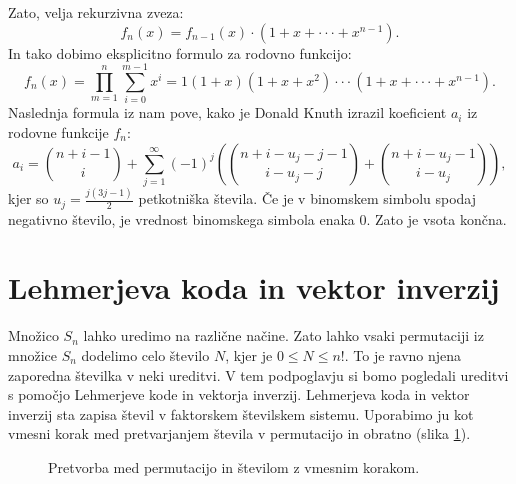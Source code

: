 \documentclass[a4paper, 12pt]{book}
\begin{document}
Zato, velja rekurzivna zveza:
\[
    f_n(x) = f_{n-1}(x) \cdot (1 + x + \cdot\cdot\cdot + x^{n-1}).
\]
In tako dobimo eksplicitno formulo za rodovno funkcijo:
\[
    f_n(x) = \prod_{m=1}^{n}\sum_{i=0}^{m-1} x^i = 1 (1 + x) (1 + x + x^2) \cdot\cdot\cdot (1 + x + \cdot\cdot\cdot + x^{n-1}).
\]
Naslednja formula iz \cite{generatingFunction} nam pove, kako je Donald Knuth izrazil koeficient $a_i$ iz rodovne funkcije $f_n$:
\[
    a_i = \binom{n+i-1}{i} + \sum_{j=1}^{\infty} (-1)^j \left( \binom{n+i-u_j-j-1}{i-u_j-j} + \binom{n+i-u_j-1}{i-u_j} \right),
\]
kjer so $u_j = \frac{j(3j-1)}{2}$ petkotniška števila. Če je v binomskem simbolu spodaj negativno število, je vrednost binomskega simbola enaka $0$. Zato je vsota končna.

\section{ Lehmerjeva koda in vektor inverzij}
Množico $S_n$ lahko uredimo na različne načine. Zato lahko vsaki permutaciji iz množice $S_n$ dodelimo celo število $N$, kjer je $0 \leq N \leq n!$. To je ravno njena zaporedna številka v neki ureditvi. V tem podpoglavju si bomo pogledali ureditvi s pomočjo Lehmerjeve kode in vektorja inverzij. Lehmerjeva koda in vektor inverzij sta zapisa števil v faktorskem številskem sistemu. Uporabimo ju kot vmesni korak med pretvarjanjem števila v permutacijo in obratno (slika \ref{pretvarjanje_permutacija_stevilo}).
\begin{figure}[h]
    \begin{center}        
    \end{center}
    \caption{Pretvorba med permutacijo in številom z vmesnim korakom.}
    \label{pretvarjanje_permutacija_stevilo}
\end{figure}
\end{document}
